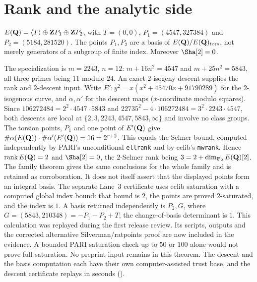 \section{Rank and the analytic side}\label{sec:rank}

\begin{theorem}\label{thm:mw}
$E(\mathbf{Q})=\langle T\rangle\oplus\mathbf{Z} P_1\oplus\mathbf{Z} P_2$, with $T=(0,0)$, $P_1=(4547,327384)$ and $P_2=(5184,281520)$. The points $P_1,P_2$ are a basis of $E(\mathbf{Q})/E(\mathbf{Q})_{\mathrm{tors}}$, not merely generators of a subgroup of finite index. Moreover $\Sha[2]=0$.
\end{theorem}
The specialization is $m=2243$, $n=12$: $m+16n^2=4547$ and $m+25n^2=5843$, all three primes being $11$ modulo $24$. An exact $2$-isogeny descent supplies the rank and $2$-descent input. Write $E'\colon y^2=x(x^2+45470x+91790289)$ for the $2$-isogenous curve, and $\alpha,\alpha'$ for the descent maps ($x$-coordinate modulo squares). Since $106272484=2^2\cdot4547\cdot5843$ and $22735^2-4\cdot106272484=3^2\cdot2243\cdot4547$, both descents are local at $\{2,3,2243,4547,5843,\infty\}$ and involve no class groups. The torsion points, $P_1$ and one point of $E'(\mathbf{Q})$ give $\#\alpha(E(\mathbf{Q}))\cdot\#\alpha'(E'(\mathbf{Q}))=16=2^{r+2}$. This equals the Selmer bound, computed independently by PARI's unconditional \texttt{ellrank} and by eclib's \texttt{mwrank}. Hence $\operatorname{rank} E(\mathbf{Q})=2$ and $\Sha[2]=0$, the $2$-Selmer rank being $3=2+\dim_{\mathbf{F}_2}E(\mathbf{Q})[2]$. The family theorem \cite[Thm.~1.2]{zywina} gives the same conclusions for the whole family and is retained as corroboration. It does not itself assert that the displayed points form an integral basis. The separate Lane~3 certificate uses eclib saturation with a computed global index bound: that bound is $2$, the points are proved $2$-saturated, and the index is $1$. A basis returned independently is $P_2,G$, where $G=(5843,210348)=-P_1-P_2+T$; the change-of-basis determinant is $1$. This calculation was replayed during the first release review. Its scripts, outputs and the corrected alternative Silverman/ratpoints proof are now included in the evidence. A bounded PARI saturation check up to $50$ or $100$ alone would not prove full saturation. No preprint input remains in this theorem. The descent and the basis computation each have their own computer-assisted trust base, and the descent certificate replays in seconds ().

